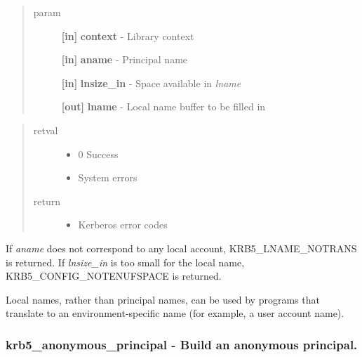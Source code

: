 \documentclass[letterpaper,10pt,english]{sphinxmanual}
\begin{document}
\begin{quote}\begin{description}
\item[{param}] \leavevmode
\textbf{{[}in{]}} \textbf{context} - Library context

\textbf{{[}in{]}} \textbf{aname} - Principal name

\textbf{{[}in{]}} \textbf{lnsize\_in} - Space available in \emph{lname}

\textbf{{[}out{]}} \textbf{lname} - Local name buffer to be filled in

\end{description}\end{quote}
\begin{quote}\begin{description}
\item[{retval}] \leavevmode\begin{itemize}
\item {} 
0   Success

\item {} 
System   errors

\end{itemize}

\item[{return}] \leavevmode\begin{itemize}
\item {} 
Kerberos error codes

\end{itemize}

\end{description}\end{quote}

If \emph{aname} does not correspond to any local account, KRB5\_LNAME\_NOTRANS is returned. If \emph{lnsize\_in} is too small for the local name, KRB5\_CONFIG\_NOTENUFSPACE is returned.

Local names, rather than principal names, can be used by programs that translate to an environment-specific name (for example, a user account name).


\subsubsection{krb5\_anonymous\_principal -  Build an anonymous principal.}
\label{appdev/refs/api/krb5_anonymous_principal:krb5-anonymous-principal-build-an-anonymous-principal}\label{appdev/refs/api/krb5_anonymous_principal::doc}
\end{document}
